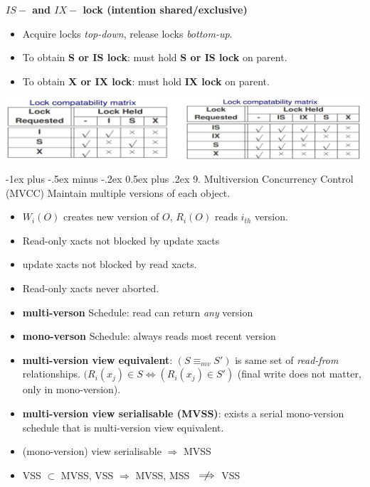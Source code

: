 \documentclass[10pt, landscape]{article}
\makeatletter
\renewcommand{\section}{\@startsection{section}{1}{0mm}%
                                {-1ex plus -.5ex minus -.2ex}%
                                {0.5ex plus .2ex}%
                                {\normalfont\large\bfseries}}
\makeatother
\begin{document}
\begin{multicols*}{3}
\textbf{$IS-$ and $IX-$ lock (intention shared/exclusive)}
\begin{itemize}
\item Acquire locks \textit{top-down}, release locks \textit{bottom-up}.
\item To obtain \textbf{S or IS lock}: must hold \textbf{S or IS lock} on parent.
\item To obtain \textbf{X or IX lock}: must hold \textbf{IX lock} on parent.
\end{itemize}
\centerline{\includegraphics[width = 0.95\linewidth]{lockCompatibility}}


\section{9. Multiversion Concurrency Control (MVCC)}
Maintain multiple versions of each object. 
\begin{itemize}
\item $W_i(O)$ creates new version of $O$, $R_i(O)$ reads $i_{th}$ version.
\item Read-only xacts not blocked by update xacts
\item update xacts not blocked by read xacts.
\item Read-only xacts never aborted.
\item \textbf{multi-verson} Schedule: read can return \textit{any} version
\item \textbf{mono-verson} Schedule: always reads most recent version
\item \textbf{multi-version view equivalent}: $(S \equiv_{mv} S')$ is same set of \textit{read-from} relationships. 
$(R_i(x_j) \in S  \Leftrightarrow (R_i(x_j) \in S')$ (final write does not matter, only in mono-version).
\item \textbf{multi-version view serialisable (MVSS)}: exists a serial mono-version schedule that is multi-version view equivalent.
\item (mono-version) view serialisable $\Rightarrow$ MVSS
\item VSS $\subset$ MVSS, VSS $\Rightarrow$ MVSS, MSS $\rlap{\(\quad\not\)}\implies$ VSS
\end{itemize}


\end{multicols*}
\end{document}
